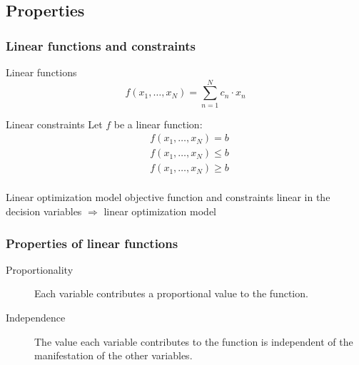 \subsection{Properties}
\begin{frame}\small
 \frametitle{Linear functions and constraints}
 \begin{block}{Linear functions}
  \vspace{-2\baselineskip}
  \begin{equation*}
    f(x_1, \ldots, x_N) = \sum_{n=1}^{N} c_n\cdot x_n
  \end{equation*}
 \end{block}
 \vspace{-\baselineskip}
 \begin{block}{Linear constraints}
  Let $f$ be a linear function:
  \begin{align*}
   &f(x_1, \ldots, x_N) = b\\
   &f(x_1, \ldots, x_N) \leq b\\
   &f(x_1, \ldots, x_N) \geq b\\
  \end{align*}
 \end{block}
 \vspace{-2\baselineskip}
 \begin{block}{Linear optimization model}
  objective function and constraints linear in the decision variables $\Longrightarrow$ linear optimization model 
 \end{block}
\end{frame}

\begin{frame}
 \frametitle{Properties of linear functions}
 \begin{description}
  \item[Proportionality] Each variable contributes a proportional value to the function.
  \item[Independence] The value each variable contributes to the function is independent of the manifestation of the other variables.
 \end{description}
\end{frame}


